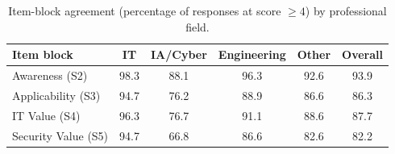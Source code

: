 \begin{table}[ht]
\centering
\caption{Item-block agreement (percentage of responses at score $\geq 4$) by professional field.}
\label{tab:field_section_agree}
\small
\begin{tabular}{lccccc}
\toprule
Item block & IT & IA/Cyber & Engineering & Other & Overall \\
\midrule
Awareness (S2) & 98.3 & 88.1 & 96.3 & 92.6 & 93.9 \\
Applicability (S3) & 94.7 & 76.2 & 88.9 & 86.6 & 86.3 \\
IT Value (S4) & 96.3 & 76.7 & 91.1 & 88.6 & 87.7 \\
Security Value (S5) & 94.7 & 66.8 & 86.6 & 82.6 & 82.2 \\
\bottomrule
\end{tabular}
\end{table}
